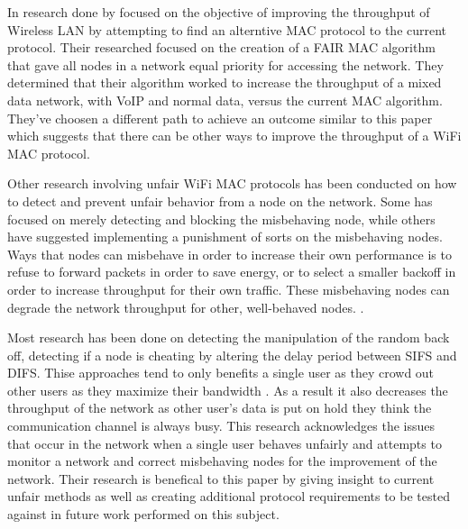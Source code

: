 \documentclass{sigcomm-alternate}
\begin{document}
In research done by \cite{Lucani} focused on the objective of improving the throughput of Wireless LAN by attempting to find an alterntive MAC protocol to the current protocol. Their researched focused on the creation of a FAIR  MAC algorithm \cite{Lucani} that gave all nodes in a network equal priority for accessing the network. They determined that their algorithm worked to increase the throughput of a mixed data network, with VoIP and normal data, versus the current MAC algorithm. They've choosen a different path to achieve an outcome similar to this paper which suggests that there can be other ways to improve the throughput of a WiFi MAC protocol.

Other research involving unfair WiFi MAC protocols has been conducted on how to detect and prevent unfair behavior from a node on the network. Some has focused on merely detecting and blocking the misbehaving node, while others have suggested implementing a punishment of sorts on the misbehaving nodes. Ways that nodes can misbehave in order to increase their own performance is to refuse to forward packets in order to save energy, or to select a smaller backoff in order to increase throughput for their own traffic. These misbehaving nodes can degrade the network throughput for other, well-behaved nodes. \cite{Kyasanur}. 	

Most research has been done on detecting the manipulation of the random back off\cite{Suresh}, detecting if a node is cheating by altering the delay period between SIFS and DIFS\cite{Domino}. Thise approaches tend to only benefits a single user as they crowd out other users as they maximize their bandwidth \cite{Domino}. As a result it also decreases the throughput of the network as other user's data is put on hold they think the communication channel is always busy. This research acknowledges the issues that occur in the network when a single user behaves unfairly and attempts to monitor a network and correct misbehaving nodes for the improvement of the network. Their research is benefical to this paper by giving insight to current unfair methods as well as creating additional protocol requirements to be tested against in future work performed on this subject.
\end{document}
